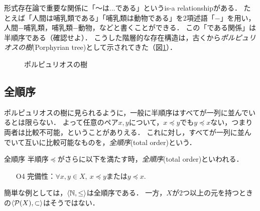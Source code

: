 \documentclass[dvipdfmx,11pt,a4paper]{jsarticle}
\begin{document}
\begin{rei}{}{}
形式存在論で重要な関係に「〜は...である」というis-a relationshipがある．
たとえば「人間は哺乳類である」「哺乳類は動物である」を2項述語「$-$」を用い，人間$-$哺乳類，哺乳類$-$動物，などと書くことができる．
この「である関係」は半順序である（確認せよ）．
こうした階層的な存在構造は，古くから\emph{ポルピュリオスの樹}(Porphyrian tree)として示されてきた（図\ref{fig:porphyrian}）．
\end{rei}
\begin{figure}[h]
\centering
{}
\caption{ポルピュリオスの樹}
\label{fig:porphyrian} 
\end{figure}






\subsection{全順序}
ポルピュリオスの樹に見られるように，一般に半順序はすべてが一列に並んでいるとは限らない．
よって任意のペア$x, y$について，$x \preceq y $でも$y \preceq x$ない，つまり両者は比較不可能，ということがありえる．
これに対し，すべてが一列に並んでいて互いに比較可能なものを，\emph{全順序}(total order)という．


\begin{dfn}{全順序}{}
半順序$\preceq$がさらに以下を満たす時，\emph{全順序}(total order)といわれる．
\begin{itemize}
 \item[O4] 完備性：$\forall x, y \in X, \ x \preceq y$または$y \preceq x$. 
\end{itemize}
\end{dfn}
%
簡単な例としては，$\langle \mathbb{N}, \leq \rangle$は全順序である．
一方，$X$が2つ以上の元を持つときの$\langle \mathcal{P}(X), \subset \rangle$はそうではない．
\end{document}
